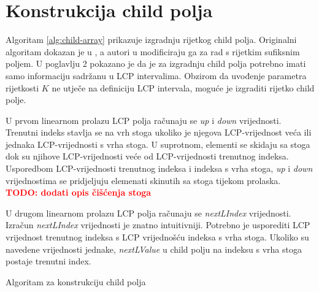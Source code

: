 \documentclass[times, utf8, seminar, numeric]{fer}
\newcommand\todo[1]{\textbf{\textcolor{red}{TODO: #1}}}
\begin{document}
\chapter{Konstrukcija child polja}

Algoritam \ref{alg:child-array} prikazuje izgradnju rijetkog child polja. Originalni algoritam dokazan je u \cite{esa}, a autori u \cite{essa} modificiraju ga za rad s rijetkim sufiksnim poljem. U poglavlju 2 pokazano je da je za izgradnju child polja potrebno imati samo informaciju sadržanu u LCP intervalima. Obzirom da uvođenje parametra rijetkosti $K$ ne utječe na definiciju LCP intervala, moguće je izgraditi rijetko child polje.

U prvom linearnom prolazu LCP polja računaju se \textit{up} i \textit{down} vrijednosti. Trenutni indeks stavlja se na vrh stoga ukoliko je njegova LCP-vrijednost veća ili jednaka LCP-vrijednosti s vrha stoga. U suprotnom, elementi se skidaju sa stoga dok su njihove LCP-vrijednosti veće od LCP-vrijednosti trenutnog indeksa. Usporedbom LCP-vrijednosti trenutnog indeksa i indeksa s vrha stoga, \textit{up} i \textit{down} vrijednostima se pridjeljuju elemenati skinutih sa stoga tijekom prolaska. \todo{dodati opis čišćenja stoga}

U drugom linearnom prolazu LCP polja računaju se \textit{nextLIndex} vrijednosti. Izračun \textit{nextLIndex} vrijednosti je znatno intuitivniji. Potrebno je usporediti LCP vrijednost trenutnog indeksa s LCP vrijednošću indeksa s vrha stoga. Ukoliko su navedene vrijednosti jednake, \textit{nextLValue} u child polju na indeksu s vrha stoga  postaje trenutni index.

\begin{algorithm}[h]
	\caption{Algoritam za konstrukciju child polja}
	\label{alg:child-array}

	
\end{algorithm}
\end{document}
